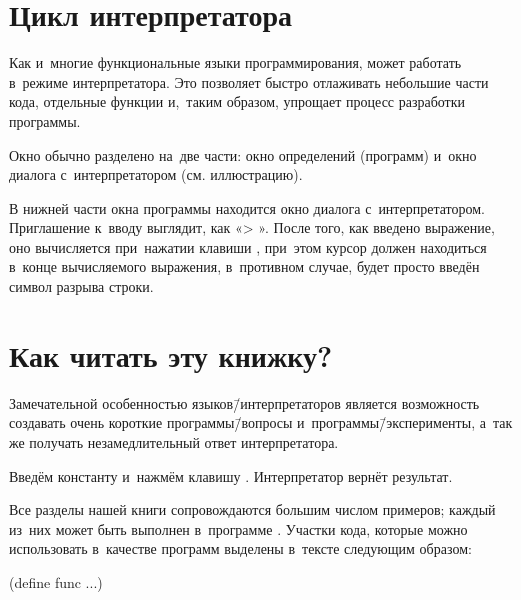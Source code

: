 \section{Цикл интерпретатора}%
Как и~многие функциональные языки программирования, \Scheme может работать в~режиме интерпретатора. Это позволяет быстро отлаживать небольшие части кода, отдельные функции и,~таким образом, упрощает процесс разработки \mbox{программы}.

Окно  обычно разделено на~две части: окно определений (программ) и~окно диалога с~интерпретатором (см. иллюстрацию).
\vspace{-\medskipamount}
\begin{center}
\end{center}

В нижней части окна программы  находится окно диалога с~интерпретатором. Приглашение к~вводу выглядит, как «> ». После того, как введено выражение, оно вычисляется при~нажатии клавиши , при~этом курсор должен находиться в~конце вычисляемого выражения, в~противном случае, будет просто введён символ разрыва строки.

\section{Как читать эту книжку?}%
Замечательной особенностью языков\=/интерпретаторов является возможность создавать очень короткие программы\=/вопросы и~программы\=/эксперименты, а~так же получать незамедлительный ответ интерпретатора. 

\begin{example}{%
Введём константу и~нажмём клавишу . Интерпретатор вернёт результат.}
\end{example}

Все разделы нашей книги сопровождаются большим числом примеров; каждый из~них может быть выполнен в~программе . Участки кода, которые можно использовать в~качестве программ выделены в~тексте следующим образом:

\begin{Definition}
(define func
 ...)
\end{Definition}

